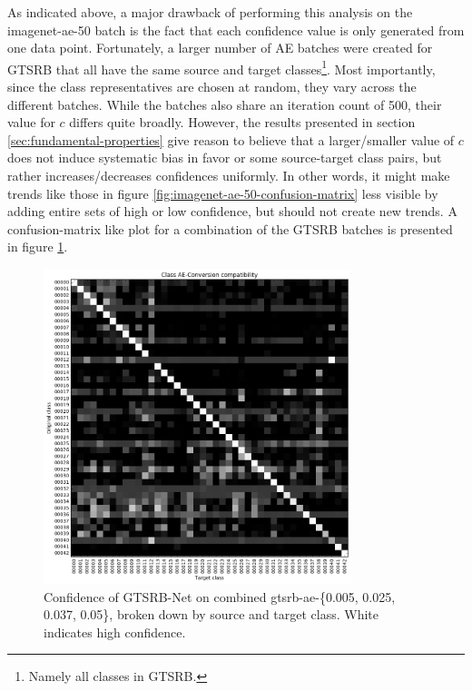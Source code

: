 \documentclass[11pt, a4paper]{article}
\begin{document}
As indicated above, a major drawback of performing this analysis on the imagenet-ae-50 batch is the fact that each confidence value is only generated from one data point. Fortunately, a larger number of AE batches were created for GTSRB that all have the same source and target classes\footnote{Namely all classes in GTSRB.}. Most importantly, since the class representatives are chosen at random, they vary across the different batches. While the batches also share an iteration count of 500, their value for $c$ differs quite broadly. However, the results presented in section \ref{sec:fundamental-properties} give reason to believe that a larger/smaller value of $c$ does not induce systematic bias in favor or some source-target class pairs, but rather increases/decreases confidences uniformly. In other words, it might make trends like those in figure \ref{fig:imagenet-ae-50-confusion-matrix} less visible by adding entire sets of high or low confidence, but should not create new trends. A confusion-matrix like plot for a combination of the GTSRB batches is presented in figure \ref{fig:gtsrb-ae-multiple-confusion-matrix}.

\begin{figure}[h!tb]
	\centering
	\includegraphics[width=0.8\textwidth]{images/confusion-matrices/gtsrb-ae-multiple-0005-0025-0037-005.png}
	\caption{Confidence of GTSRB-Net on combined gtsrb-ae-\{0.005, 0.025, 0.037, 0.05\}, broken down by source and target class. White indicates high confidence.}
	\label{fig:gtsrb-ae-multiple-confusion-matrix}
\end{figure}
\end{document}
